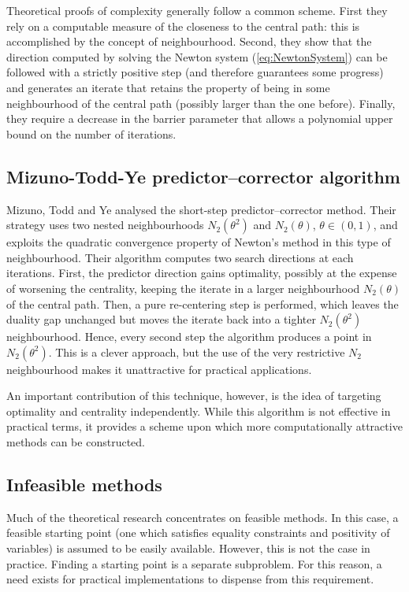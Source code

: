\hrulefill

Theoretical proofs of complexity generally follow a common scheme.
First they rely on a computable measure of the closeness to the central
path: this is accomplished by the concept of neighbourhood. Second,
they show that the direction computed by solving the Newton system
(\ref{eq:NewtonSystem}) can be followed with a strictly positive step
(and therefore guarantees some progress) and generates an iterate 
that retains the property of being in some neighbourhood of the central 
path (possibly larger than the one before). Finally, they require
a decrease in the barrier parameter that allows a polynomial upper
bound on the number of iterations.

%
%
\subsection{Mizuno-Todd-Ye predictor--corrector algorithm}

Mizuno, Todd and Ye \cite{MizunoToddYe} analysed the short-step 
predictor--corrector method. Their strategy uses two nested neighbourhoods 
$N_2(\theta^2)$ and $N_2(\theta)$, $\theta \in (0,1)$, and exploits the
quadratic convergence property of Newton's method in this type of 
neighbourhood.
Their algorithm computes two search directions at each iterations.
First, the predictor direction gains optimality, possibly at the expense of
worsening the centrality, keeping the iterate in a larger neighbourhood
$N_2(\theta)$ of the central path. Then, a pure re-centering step 
is performed, which leaves the duality gap unchanged but 
moves the iterate back into a 
tighter $N_2(\theta^2)$ neighbourhood. Hence, every second step the 
algorithm produces a point in $N_2(\theta^2)$. This is a clever 
approach, but the use of the very restrictive $N_2$ neighbourhood 
makes it unattractive for practical applications.

An important contribution of this technique, however, is the idea 
of targeting optimality and centrality independently. While this 
algorithm is not effective in practical terms, it provides a scheme 
upon which more computationally attractive methods can be constructed.


%
%
\subsection{Infeasible methods}

Much of the theoretical research concentrates on feasible 
methods. In this case, a feasible starting point (one which 
satisfies equality constraints and positivity of variables) 
is assumed to be easily available. However, this is not the 
case in practice. Finding a starting point is a separate 
subproblem. For this reason, a need exists for practical 
implementations to dispense from this requirement.

